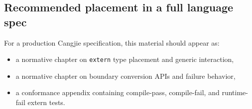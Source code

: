 \documentclass[11pt,a4paper]{article}
\begin{document}
\subsection{Recommended placement in a full language spec}

For a production Cangjie specification, this material should appear as:
\begin{itemize}
  \item a normative chapter on \texttt{extern} type placement and generic interaction,
  \item a normative chapter on boundary conversion APIs and failure behavior,
  \item a conformance appendix containing compile-pass, compile-fail, and runtime-fail extern tests.
\end{itemize}
\end{document}
